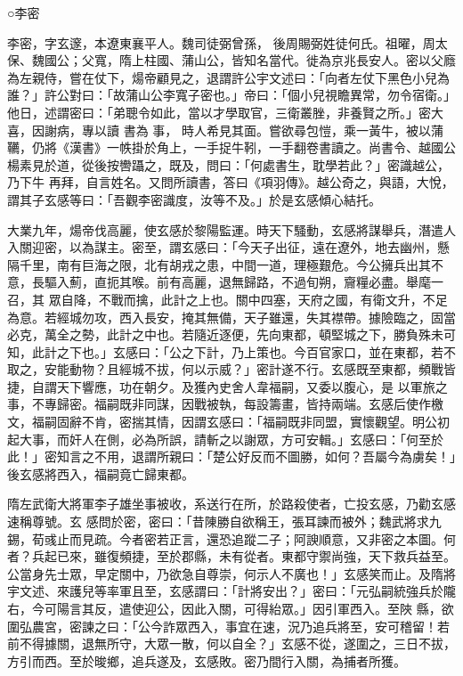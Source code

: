 
\begin{pinyinscope}

 ○李密



 李密，字玄邃，本遼東襄平人。魏司徒弼曾孫，
 後周賜弼姓徒何氏。祖曜，周太保、魏國公；父寬，隋上柱國、蒲山公，皆知名當代。徙為京兆長安人。密以父廕為左親侍，嘗在仗下，煬帝顧見之，退謂許公宇文述曰：「向者左仗下黑色小兒為誰？」許公對曰：「故蒲山公李寬子密也。」帝曰：「個小兒視瞻異常，勿令宿衛。」他日，述謂密曰：「弟聰令如此，當以才學取官，三衛叢脞，非養賢之所。」密大喜，因謝病，專以讀
 書為
 事，
 時人希見其面。嘗欲尋包愷，乘一黃牛，被以蒲韉，仍將《漢書》一帙掛於角上，一手捉牛靷，一手翻卷書讀之。尚書令、越國公楊素見於道，從後按轡躡之，既及，問曰：「何處書生，耽學若此？」密識越公，乃下牛
 再拜，自言姓名。又問所讀書，答曰《項羽傳》。越公奇之，與語，大悅，謂其子玄感等曰：「吾觀李密識度，汝等不及。」於是玄感傾心結托。



 大業九年，煬帝伐高麗，使玄感於黎陽監運。時天下騷動，玄感將謀舉兵，潛遣人入關迎密，以為謀主。密至，謂玄感曰：「今天子出征，遠在遼外，地去幽州，懸隔千里，南有巨海之限，北有胡戎之患，中間一道，理極艱危。今公擁兵出其不意，長驅入薊，直扼其喉。前有高麗，退無歸路，不過旬朔，齎糧必盡。舉麾一召，其
 眾自降，不戰而擒，此計之上也。關中四塞，天府之國，有衛文升，不足為意。若經城勿攻，西入長安，掩其無備，天子雖還，失其襟帶。據險臨之，固當必克，萬全之勢，此計之中也。若隨近逐便，先向東都，頓堅城之下，勝負殊未可知，此計之下也。」玄感曰：「公之下計，乃上策也。今百官家口，並在東都，若不取之，安能動物？且經城不拔，何以示威？」密計遂不行。玄感既至東都，頻戰皆捷，自謂天下響應，功在朝夕。及獲內史舍人韋福嗣，又委以腹心，是
 以軍旅之事，不專歸密。福嗣既非同謀，因戰被執，每設籌畫，皆持兩端。玄感后使作檄文，福嗣固辭不肯，密揣其情，因謂玄感曰：「福嗣既非同盟，實懷觀望。明公初起大事，而奸人在側，必為所誤，請斬之以謝眾，方可安輯。」玄感曰：「何至於此！」密知言之不用，退謂所親曰：「楚公好反而不圖勝，如何？吾屬今為虜矣！」後玄感將西入，福嗣竟亡歸東都。



 隋左武衛大將軍李子雄坐事被收，系送行在所，於路殺使者，亡投玄感，乃勸玄感速稱尊號。玄
 感問於密，密曰：「昔陳勝自欲稱王，張耳諫而被外；魏武將求九錫，荀彧止而見疏。今者密若正言，還恐追蹤二子；阿諛順意，又非密之本圖。何者？兵起已來，雖復頻捷，至於郡縣，未有從者。東都守禦尚強，天下救兵益至。公當身先士眾，早定關中，乃欲急自尊崇，何示人不廣也！」玄感笑而止。及隋將宇文述、來護兒等率軍且至，玄感謂曰：「計將安出？」密曰：「元弘嗣統強兵於隴右，今可陽言其反，遣使迎公，因此入關，可得紿眾。」因引軍西入。至陜
 縣，欲圍弘農宮，密諫之曰：「公今詐眾西入，事宜在速，況乃追兵將至，安可稽留！若前不得據關，退無所守，大眾一散，何以自全？」玄感不從，遂圍之，三日不拔，方引而西。至於晙鄉，追兵遂及，玄感敗。密乃間行入關，為捕者所獲。




\end{pinyinscope}
